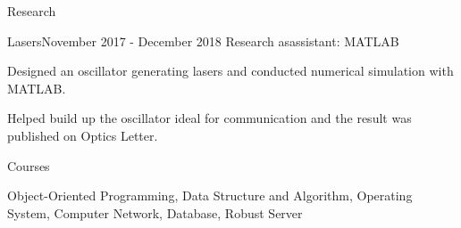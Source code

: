 \documentclass{resume} %
\begin{document}


\begin{rSection}{Research}

    \begin{rSubsection}{Lasers}{November 2017 - December 2018}
    {Research asassistant: MATLAB}{}
    \item Designed an oscillator generating lasers and conducted numerical simulation with MATLAB.
    \item Helped build up the oscillator ideal for communication and the result was published on Optics Letter. 
    \end{rSubsection}
    
\end{rSection}


\begin{rSection}{Courses}

\item Object-Oriented Programming, Data Structure and Algorithm, Operating System, Computer Network, Database,
Robust Server

\end{rSection}



%
%
\end{document}
